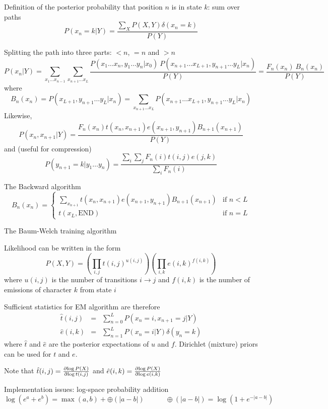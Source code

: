 \documentclass{beamer}
\begin{document}
\begin{frame}{}
\itemb
\item Definition of the posterior probability that position $n$ is in state $k$: sum over paths
\[
P(x_n=k|Y) = \frac{\sum_X P(X,Y) \delta(x_n=k)}{P(Y)}
\]
\item Splitting the path into three parts: $<n$, $=n$ and $>n$
\[
P(x_n|Y) = \sum_{x_1 \ldots x_{n-1}} \sum_{x_{n+1} \ldots x_L} \frac{P(x_1 \ldots x_n,y_1 \ldots y_n|x_0)\ P(x_{n+1} \ldots x_{L+1},y_{n+1} \ldots y_L|x_n)}{P(Y)}
= \frac{F_n(x_n)\ B_n(x_n)}{P(Y)}
\]
where
\[
B_n(x_n) = P(x_{L+1},y_{n+1} \ldots y_L|x_n) = \sum_{x_{n+1} \ldots x_L} P(x_{n+1} \ldots x_{L+1}, y_{n+1} \ldots y_L|x_n)
\]
Likewise,
\[
P(x_n,x_{n+1}|Y) = \frac{F_n(x_n)t(x_n,x_{n+1})e(x_{n+1},y_{n+1})B_{n+1}(x_{n+1})}{P(Y)}
\]
and (useful for compression)
\[
P(y_{n+1}=k|y_1 \ldots y_n) = \frac{\sum_i \sum_j F_n(i) t(i,j) e(j,k)}{\sum_i F_n(i)}
\]
\item The Backward algorithm
\[
B_n(x_n) = \left\{ \begin{array}{ll} \displaystyle
\sum_{x_{n+1}} t(x_n,x_{n+1}) e(x_{n+1},y_{n+1}) B_{n+1}(x_{n+1}) & \mbox{if $n < L$} \\
t(x_L,\mbox{END}) & \mbox{if $n=L$}
\end{array} \right.
\]
\item The Baum-Welch training algorithm
 \itemb
 \item Likelihood can be written in the form
\[
P(X,Y) = \left( \prod_{i,j} t(i,j)^{u(i,j)} \right) \left( \prod_{i,k} e(i,k)^{f(i,k)} \right)
\]
where $u(i,j)$ is the number of transitions $i \to j$ and $f(i,k)$ is the number of emissions of character $k$ from state $i$
 \item Sufficient statistics for EM algorithm are therefore
\begin{eqnarray*}
\hat{t}(i,j) & = & \sum_{n=0}^L P(x_n=i,x_{n+1}=j|Y) \\
\hat{e}(i,k) & = & \sum_{n=1}^L P(x_n=i|Y) \delta(y_n=k)
\end{eqnarray*}
where $\hat{t}$ and $\hat{e}$ are the posterior expectations of $u$ and $f$.
Dirichlet (mixture) priors can be used for $t$ and $e$.
 \item Note that $\hat{t}(i,j) = \frac{\partial {\log P(X)}}{\partial {\log t(i,j)}}$ and $\hat{e}(i,k)=\frac{\partial {\log P(X)}}{\partial {\log e(i,k)}}$
 \iteme
\item Implementation issues: log-space probability addition
\[
\log(e^a+e^b) = \max(a,b) + \oplus(|a-b|) \quad\quad\quad
\oplus(|a-b|) = \log(1+e^{-|a-b|})
\]
\end{frame}
\end{document}
